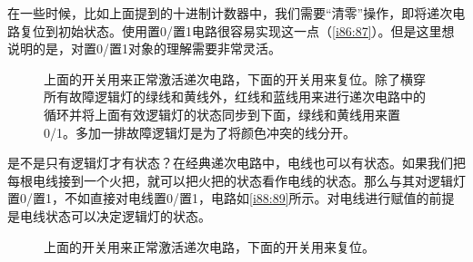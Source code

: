 在一些时候，比如上面提到的十进制计数器中，我们需要“清零”操作，即将递次电路复位到初始状态。使用置0/置1电路很容易实现这一点（\autoref{i86:87}）。但是这里想说明的是，对置0/置1对象的理解需要非常灵活。

\begin{figure}[!ht]
\begin{center}
\end{center}
\caption{上面的开关用来正常激活递次电路，下面的开关用来复位。除了横穿所有故障逻辑灯的绿线和黄线外，红线和蓝线用来进行递次电路中的循环并将上面有效逻辑灯的状态同步到下面，绿线和黄线用来置0/1。多加一排故障逻辑灯是为了将颜色冲突的线分开。}
\label{i86:87}
\end{figure}

是不是只有逻辑灯才有状态？在经典递次电路中，电线也可以有状态。如果我们把每根电线接到一个火把，就可以把火把的状态看作电线的状态。那么与其对逻辑灯置0/置1，不如直接对电线置0/置1，电路如\autoref{i88:89}所示。对电线进行赋值的前提是电线状态可以决定逻辑灯的状态。

\begin{figure}[!ht]
\begin{center}
\end{center}
\caption{上面的开关用来正常激活递次电路，下面的开关用来复位。}
\label{i88:89}
\end{figure}

